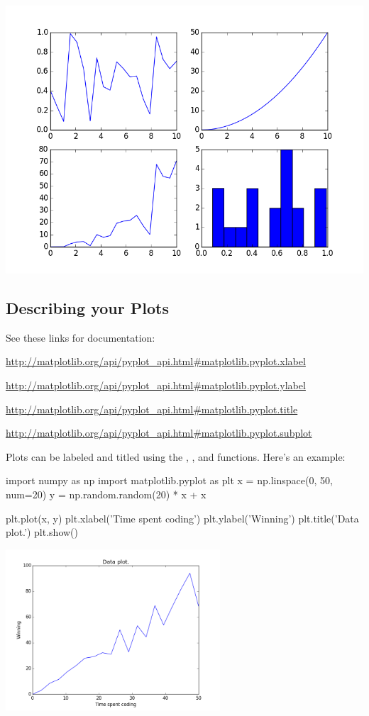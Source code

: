 \documentclass[11pt]{cselabheader}
\begin{document}
\begin{center}
  \includegraphics[width=\textwidth]{img/matplotlib_subplot.png}
\end{center}

\subsection{Describing your Plots}
See these links for documentation:
\begin{center}
\url{http://matplotlib.org/api/pyplot_api.html#matplotlib.pyplot.xlabel}

\url{http://matplotlib.org/api/pyplot_api.html#matplotlib.pyplot.ylabel}

\url{http://matplotlib.org/api/pyplot_api.html#matplotlib.pyplot.title}

\url{http://matplotlib.org/api/pyplot_api.html#matplotlib.pyplot.subplot}
\end{center}

Plots can be labeled and titled using the
,
,
and  functions.
Here's an example:

\begin{python3code}
import numpy as np
import matplotlib.pyplot as plt
x = np.linspace(0, 50, num=20)
y = np.random.random(20) * x + x

plt.plot(x, y)
plt.xlabel('Time spent coding')
plt.ylabel('Winning')
plt.title('Data plot.')
plt.show()
\end{python3code}

\begin{center}
  \includegraphics[width=0.6\textwidth]{img/matplotlib_labeled1.png}
\end{center}
\end{document}
